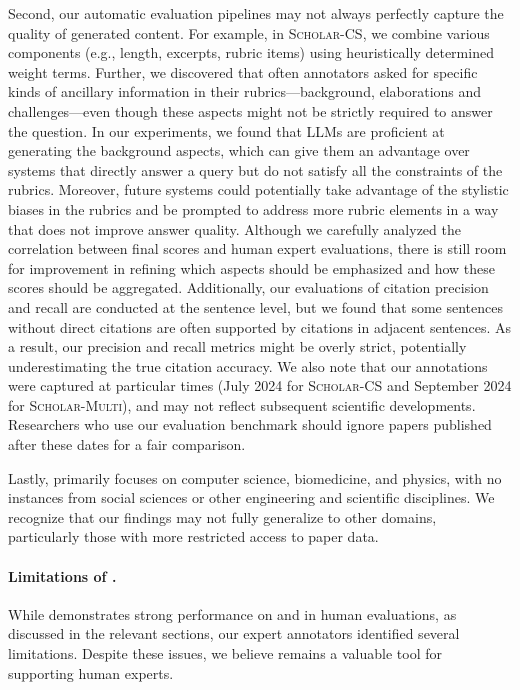 Second, our automatic evaluation pipelines may not always perfectly capture the quality of generated content. For example, in \textsc{Scholar-CS}, we combine various components (e.g., length, excerpts, rubric items) using heuristically determined weight terms. {Further, we discovered that often annotators asked for specific kinds of ancillary information in their rubrics---background, elaborations and challenges---even though these aspects might not be strictly required to answer the question. In our experiments, we found that LLMs are proficient at generating the background aspects, which can give them an advantage over systems that directly answer a query but do not satisfy all the constraints of the rubrics. Moreover, future systems could potentially take advantage of the stylistic biases in the rubrics and be prompted to address more rubric elements in a way that does not improve answer quality.} Although we carefully analyzed the correlation between final scores and human expert evaluations, there is still room for improvement in refining which aspects should be emphasized and how these scores should be aggregated. Additionally, our evaluations of citation precision and recall are conducted at the sentence level, but we found that some sentences without direct citations are often supported by citations in adjacent sentences. As a result, our precision and recall metrics might be overly strict, potentially underestimating the true citation accuracy.  We also note that our annotations were captured at particular times (July 2024 for \textsc{Scholar-CS} and September 2024 for \textsc{Scholar-Multi}), and may not reflect subsequent scientific developments. 
Researchers who use our evaluation benchmark should ignore papers published after these dates for a fair comparison.

Lastly, \data primarily focuses on computer science, biomedicine, and physics, with no instances from social sciences or other engineering and scientific disciplines. We recognize that our findings may not fully generalize to other domains, particularly those with more restricted access to paper data.

\paragraph{Limitations of \model.}
While \model demonstrates strong performance on \data and in human evaluations, as discussed in the relevant sections, our expert annotators identified several limitations. 
Despite these issues, we believe \model remains a valuable tool for supporting human experts. 

